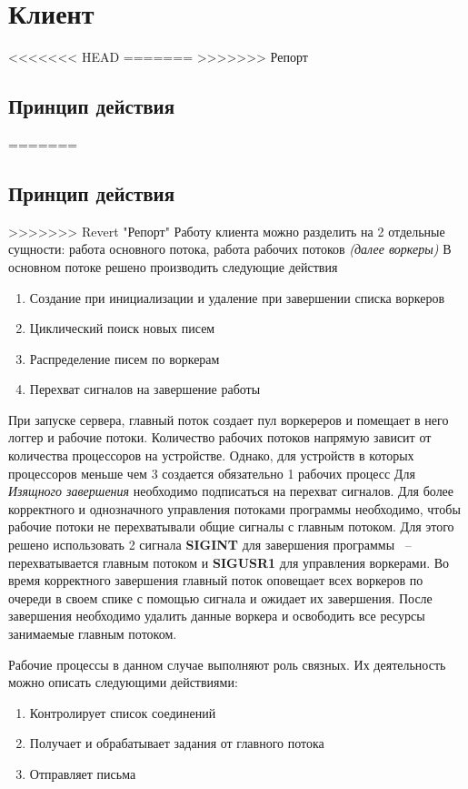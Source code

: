 \documentclass[a4paper,12pt]{report}
\begin{document}
\section*{Клиент}

<<<<<<< HEAD
=======
>>>>>>> Репорт
\subsection{Принцип действия}
=======
\subsection*{Принцип действия}
>>>>>>> Revert "Репорт"
Работу клиента можно разделить на 2 отдельные сущности: работа основного потока, работа рабочих потоков \textit{(далее воркеры)}
В основном потоке решено производить следующие действия
\begin{enumerate}
    \item Создание при инициализации и удаление при завершении списка воркеров
    \item Циклический поиск новых писем
    \item Распределение писем по воркерам
    \item Перехват сигналов на завершение работы
\end{enumerate}

При запуске сервера, главный поток создает пул воркереров и помещает в него логгер и рабочие потоки. Количество рабочих потоков напрямую зависит от количества процессоров на устройстве. Однако, для устройств в которых процессоров меньше чем 3 создается обязательно 1 рабочих процесс
Для \textit{Изящного завершения} необходимо подписаться на перехват сигналов. Для более корректного и однозначного управления потоками программы необходимо, чтобы рабочие потоки не перехватывали общие сигналы с главным потоком. Для этого решено использовать 2 сигнала \textbf{SIGINT} для завершения программы ~-- перехватывается главным потоком и \textbf{SIGUSR1} для управления воркерами. Во время корректного завершения главный поток оповещает всех воркеров по очереди в своем спике с помощью сигнала и ожидает их завершения. После завершения необходимо удалить данные воркера и освободить все ресурсы занимаемые главным потоком.

Рабочие процессы в данном случае выполняют роль связных. Их деятельность можно описать следующими действиями:
\begin{enumerate}
    \item Контролирует список соединений
    \item Получает и обрабатывает задания от главного потока
    \item Отправляет письма
\end{enumerate}
\end{document}
